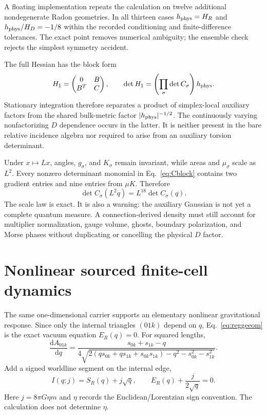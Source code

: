\documentclass[11pt]{article}
\theoremstyle{definition}
\theoremstyle{remark}
\newcommand{\dd}{\mathrm d}
\begin{document}
A floating implementation repeats the calculation on twelve additional nondegenerate Radon geometries.  In all thirteen cases $h_{\rm phys}=H_R$ and $h_{\rm phys}/H_D=-1/8$ within the recorded conditioning and finite-difference tolerances.  The exact point removes numerical ambiguity; the ensemble check rejects the simplest symmetry accident.

The full Hessian has the block form
\begin{equation}
 H_1=\begin{pmatrix}0&B\\B^T&C\end{pmatrix},
 \qquad
 \det H_1=\left(\prod_\sigma\det C_\sigma\right)h_{\rm phys}.
 \label{eq:blockdet}
\end{equation}
Stationary integration therefore separates a product of simplex-local auxiliary factors from the shared bulk-metric factor $|h_{\rm phys}|^{-1/2}$.  The continuously varying nonfactorizing $D$ dependence occurs in the latter.  It is neither present in the bare relative incidence algebra nor required to arise from an auxiliary torsion determinant.

Under $x\mapsto Lx$, angles, $g_\sigma$, and $K_\sigma$ remain invariant, while areas and $\mu_\sigma$ scale as $L^2$.  Every nonzero determinant monomial in Eq.~\eqref{eq:Cblock} contains two gradient entries and nine entries from $\mu K$.  Therefore
\begin{equation}
 \det C_\sigma(L^2q)=L^{18}\det C_\sigma(q).
 \label{eq:scalelaw}
\end{equation}
The scale law is exact.  It is also a warning: the auxiliary Gaussian is not yet a complete quantum measure.  A connection-derived density must still account for multiplier normalization, gauge volume, ghosts, boundary polarization, and Morse phases without duplicating or cancelling the physical $D$ factor.

\section{Nonlinear sourced finite-cell dynamics}

The same one-dimensional carrier supports an elementary nonlinear gravitational response.  Since only the internal triangles $(01k)$ depend on $q$, Eq.~\eqref{eq:reggeeom} is the exact vacuum equation $E_R(q)=0$.  For squared lengths,
\begin{equation}
 \frac{\dd A_{01k}}{\dd q}=
 \frac{s_{0k}+s_{1k}-q}
 {4\sqrt{2(qs_{0k}+qs_{1k}+s_{0k}s_{1k})-q^2-s_{0k}^2-s_{1k}^2}}.
\end{equation}
Add a signed worldline segment on the internal edge,
\begin{equation}
 I(q;j)=S_R(q)+j\sqrt q,
 \qquad
 E_R(q)+\frac{j}{2\sqrt q}=0.
 \label{eq:sourced}
\end{equation}
Here $j=8\pi G\eta m$ and $\eta$ records the Euclidean/Lorentzian sign convention.  The calculation does not determine $\eta$.
\end{document}
